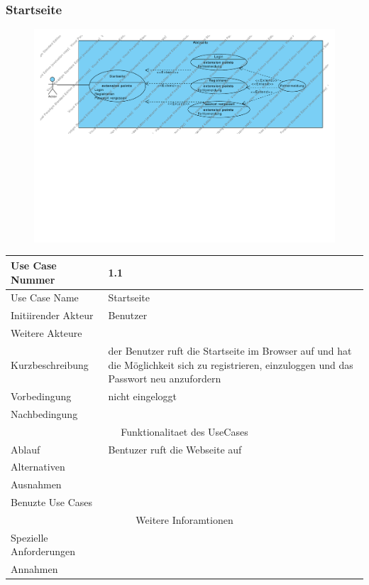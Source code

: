 \documentclass[10pt,a4paper]{article}
\begin{document}
	\subsubsection{Startseite}
	\begin{figure}[h]
		\includegraphics[width=\linewidth]{gfx/webseite/startseite.pdf}
	\end{figure}
	\begin{tabular}{|l|p{.5\linewidth}|}
	\hline Use Case Nummer & 1.1 \\ 
	\hline Use Case Name & Startseite \\ 
	\hline Initiirender Akteur & Benutzer \\
	\hline Weitere Akteure &  \\
	\hline Kurzbeschreibung & der Benutzer ruft die Startseite im Browser auf und hat die M\"oglichkeit sich zu registrieren, einzuloggen und das Passwort neu anzufordern \\
	\hline Vorbedingung & nicht eingeloggt \\
	\hline Nachbedingung &  \\
	\hline \multicolumn{2}{|c|}{Funktionalitaet des UseCases}\\
	\hline Ablauf & Bentuzer ruft die Webseite auf \\
	\hline Alternativen &  \\
	\hline Ausnahmen &  \\
	\hline Benuzte Use Cases &  \\
	\hline \multicolumn{2}{|c|}{Weitere Inforamtionen} \\
	\hline Spezielle Anforderungen &  \\
	\hline Annahmen &  \\
	\hline
	\end{tabular} 
\end{document}
